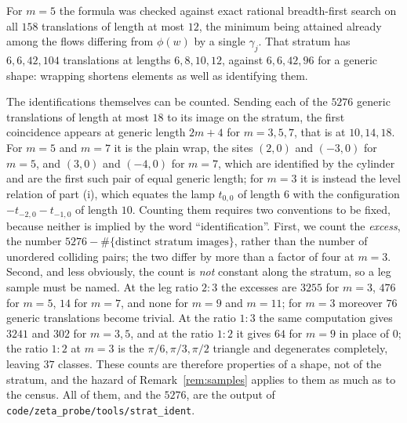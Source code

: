 \documentclass[11pt]{article}
\theoremstyle{definition}
\theoremstyle{remark}
\begin{document}
For $m=5$ the formula was checked against exact rational breadth-first search
on all $158$ translations of length at most $12$, the minimum being attained
already among the flows differing from $\phi(w)$ by a single $\gamma_j$. That
stratum has $6,6,42,104$ translations at lengths $6,8,10,12$, against
$6,6,42,96$ for a generic shape: wrapping shortens elements as well as
identifying them.

The identifications themselves can be counted. Sending each of the $5276$
generic translations of length at most $18$ to its image on the stratum, the
first coincidence appears at generic length $2m+4$ for $m=3,5,7$, that is at
$10,14,18$. For $m=5$ and $m=7$ it is the plain wrap, the sites $(2,0)$ and
$(-3,0)$ for $m=5$, and $(3,0)$ and $(-4,0)$ for $m=7$, which are identified
by the cylinder and are the first such pair of equal generic length; for $m=3$
it is instead the level relation of part (i), which equates the lamp $t_{0,0}$
of length $6$ with the configuration $-t_{-2,0}-t_{-1,0}$ of length $10$.
Counting them requires two conventions to be fixed, because neither is implied
by the word ``identification''. First, we count the \emph{excess}, the number
$5276-\#\{\text{distinct stratum images}\}$, rather than the number of unordered
colliding pairs; the two differ by more than a factor of four at $m=3$. Second,
and less obviously, the count is \emph{not} constant along the stratum, so a leg
sample must be named. At the leg ratio $2:3$ the excesses are $3255$ for $m=3$,
$476$ for $m=5$, $14$ for $m=7$, and none for $m=9$ and $m=11$; for $m=3$
moreover $76$ generic translations become trivial. At the ratio $1:3$ the same
computation gives $3241$ and $302$ for $m=3,5$, and at the ratio $1:2$ it gives
$64$ for $m=9$ in place of $0$; the ratio $1:2$ at $m=3$ is the
$\pi/6,\pi/3,\pi/2$ triangle and degenerates completely, leaving $37$ classes.
These counts are therefore properties of a shape, not of the stratum, and the
hazard of Remark~\ref{rem:samples} applies to them as much as to the census.
All of them, and the $5276$, are the output of
\texttt{code/zeta\_probe/tools/strat\_ident}.
\end{document}

